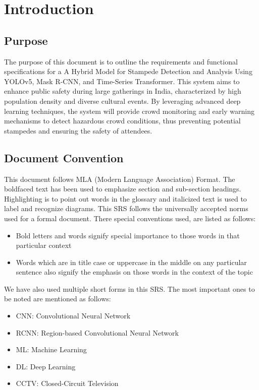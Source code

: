 \documentclass[11pt]{report}
\begin{document}
\section{Introduction}
\subsection{Purpose}
	The purpose of this document is to outline the requirements and functional specifications for a A Hybrid Model for Stampede Detection and Analysis Using YOLOv5, Mask R-CNN, and Time-Series Transformer. This system aims to enhance public safety during large gatherings in India, characterized by high population density and diverse cultural events. By leveraging advanced deep learning techniques, the system will provide  crowd monitoring and early warning mechanisms to detect hazardous crowd conditions, thus preventing potential stampedes and ensuring the safety of attendees.
\subsection{Document Convention}
    This document follows MLA (Modern Language Association) Format. The boldfaced text has been used to emphasize section and sub-section headings. Highlighting is to point out words in the glossary and italicized text is used to label and recognize diagrams. 
    This SRS follows the universally accepted norms used for a formal document. There 
    special conventions used, are listed as follows:
    \begin{itemize}
        \item Bold letters and words signify special importance to those words in that particular context
        \item Words which are in title case or uppercase in the middle on any particular sentence also
        signify the emphasis on those words in the context of the topic
    \end{itemize}
    
    We have also used multiple short forms in this SRS. The most important ones to be noted are
    mentioned as follows:
    \begin{itemize}
        \item CNN: Convolutional Neural Network
        \item RCNN: Region-based Convolutional Neural Network
        \item ML: Machine Learning
        \item DL: Deep Learning
        \item CCTV: Closed-Circuit Television
    \end{itemize}
\end{document}
